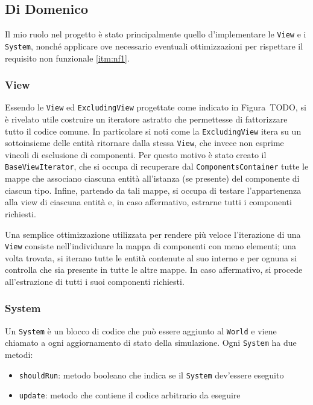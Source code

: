 \subsection{Di Domenico}\label{subsec:nicolò-di-domenico}

Il mio ruolo nel progetto è stato principalmente quello d'implementare le \texttt{View} e i \texttt{System}, nonché
applicare ove necessario eventuali ottimizzazioni per rispettare il requisito non funzionale \ref{itm:nf1}.

\subsubsection{View}

Essendo le \texttt{View} ed \texttt{ExcludingView} progettate come indicato in Figura~TODO, si è rivelato utile costruire un
iteratore astratto che permettesse di fattorizzare tutto il codice comune.
In particolare si noti come la \texttt{ExcludingView} itera su un sottoinsieme delle entità ritornare dalla stessa
\texttt{View}, che invece non esprime vincoli di esclusione di componenti.
Per questo motivo è stato creato il \texttt{BaseViewIterator}, che si occupa di recuperare dal
\texttt{ComponentsContainer} tutte le mappe che associano ciascuna entità all'istanza (se presente) del componente di
ciascun tipo.
Infine, partendo da tali mappe, si occupa di testare l'appartenenza alla view di ciascuna entità e, in caso affermativo,
estrarne tutti i componenti richiesti.

Una semplice ottimizzazione utilizzata per rendere più veloce l'iterazione di una \texttt{View} consiste nell'individuare
la mappa di componenti con meno elementi;
una volta trovata, si iterano tutte le entità contenute al suo interno e per ognuna si controlla che sia presente in tutte
le altre mappe.
In caso affermativo, si procede all'estrazione di tutti i suoi componenti richiesti.

\subsubsection{System}

Un \texttt{System} è un blocco di codice che può essere aggiunto al \texttt{World} e viene chiamato a ogni aggiornamento
di stato della simulazione.
Ogni \texttt{System} ha due metodi:
\begin{itemize}
    \item \texttt{shouldRun}: metodo booleano che indica se il \texttt{System} dev'essere eseguito
    \item \texttt{update}: metodo che contiene il codice arbitrario da eseguire
\end{itemize}

